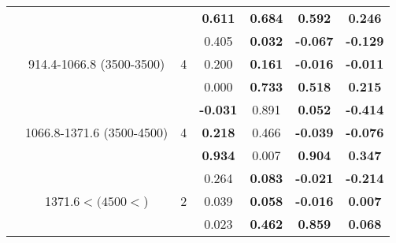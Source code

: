 \begin{table}[htbp]
\begin{tabular}{rrrcccc}
    \multicolumn{1}{c}{} & \multicolumn{1}{c}{} & \multicolumn{1}{c}{} & \textbf{0.611 } & \textbf{0.684 } & \textbf{0.592 } & \textbf{0.246 } \bigstrut\\\cline{4-7}\noalign{\smallskip}
    \multicolumn{1}{c}{\multirow{3}[2]{*}{4}} & \multicolumn{1}{c}{\multirow{3}[2]{2.5cm}{914.4-1066.8 (3500-3500)}} & \multicolumn{1}{c}{\multirow{3}[2]{*}{4}} & 0.405  & \textbf{0.032 } & \textbf{-0.067 } & \textbf{-0.129 } \\
    \multicolumn{1}{c}{} & \multicolumn{1}{c}{} & \multicolumn{1}{c}{} & 0.200  & \textbf{0.161 } & \textbf{-0.016 } & \textbf{-0.011 } \\
    \multicolumn{1}{c}{} & \multicolumn{1}{c}{} & \multicolumn{1}{c}{} & 0.000  & \textbf{0.733 } & \textbf{0.518 } & \textbf{0.215 } \bigstrut\\\cline{4-7}\noalign{\smallskip}
    \multicolumn{1}{c}{\multirow{3}[2]{*}{5}} & \multicolumn{1}{c}{\multirow{3}[2]{2.5cm}{1066.8-1371.6 (3500-4500)}} & \multicolumn{1}{c}{\multirow{3}[2]{*}{4}} & \textbf{-0.031 } & 0.891  & \textbf{0.052 } & \textbf{-0.414 } \\
    \multicolumn{1}{c}{} & \multicolumn{1}{c}{} & \multicolumn{1}{c}{} & \textbf{0.218 } & 0.466  & \textbf{-0.039 } & \textbf{-0.076 } \\
    \multicolumn{1}{c}{} & \multicolumn{1}{c}{} & \multicolumn{1}{c}{} & \textbf{0.934 } & 0.007  & \textbf{0.904 } & \textbf{0.347 } \bigstrut\\\cline{4-7}\noalign{\smallskip}
    \multicolumn{1}{c}{\multirow{3}[2]{*}{6}} & \multicolumn{1}{c}{\multirow{3}[2]{2.5cm}{1371.6$< (4500<$)}} & \multicolumn{1}{c}{\multirow{3}[2]{*}{2}} & 0.264  & \textbf{0.083 } & \textbf{-0.021 } & \textbf{-0.214 } \\
    \multicolumn{1}{c}{} & \multicolumn{1}{c}{} & \multicolumn{1}{c}{} & 0.039  & \textbf{0.058 } & \textbf{-0.016 } & \textbf{0.007 } \\
    \multicolumn{1}{c}{} & \multicolumn{1}{c}{} & \multicolumn{1}{c}{} & 0.023  & \textbf{0.462 } & \textbf{0.859 } & \textbf{0.068 } \\
    \bottomrule
    \end{tabular}%
  \label{tab:Set3TVJD}%
\end{table}%
